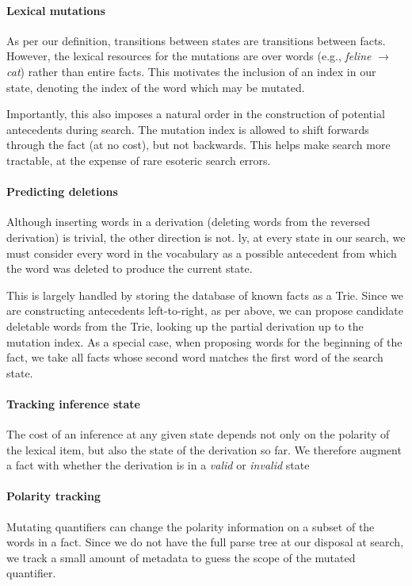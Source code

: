 \paragraph{Lexical mutations}
As per our definition, transitions between states are transitions 
  between facts.
However, the lexical resources for the mutations are over words
  (e.g., \textit{feline} $\rightarrow$ \textit{cat}) rather than
  entire facts.
This motivates the inclusion of an index in our state, denoting the
  index of the word which may be mutated.

Importantly, this also imposes a natural order in the construction of
  potential antecedents during search.
The mutation index is allowed to shift forwards through the
  fact (at no cost), but not backwards.
This helps make search more tractable, at the expense of rare
  esoteric search errors.


\paragraph{Predicting deletions}
Although inserting words in a derivation (deleting words from
  the reversed derivation) is trivial, the other direction is not.
\naive ly, at every state in our search, we must consider every word in
  the vocabulary as a possible antecedent from which the word was deleted
  to produce the current state.

This is largely handled by storing the database of known facts as a
  Trie.
Since we are constructing antecedents left-to-right, as per above,
  we can propose candidate deletable words from the Trie, looking up
  the partial derivation up to the mutation index.
As a special case, when proposing words for the beginning of the
  fact, we take all facts whose second word matches the first word
  of the search state.

\paragraph{Tracking inference state}
The cost of an inference at any given state depends not only on the
  polarity of the lexical item, but also the state of the derivation
  so far.
We therefore augment a fact with whether the derivation is in a
  \textit{valid} or \textit{invalid} state

\paragraph{Polarity tracking}
Mutating quantifiers can change the polarity information on a subset
  of the words in a fact.
Since we do not have the full parse tree at our disposal at search,
  we track a small amount of metadata to guess the scope of the
  mutated quantifier.

